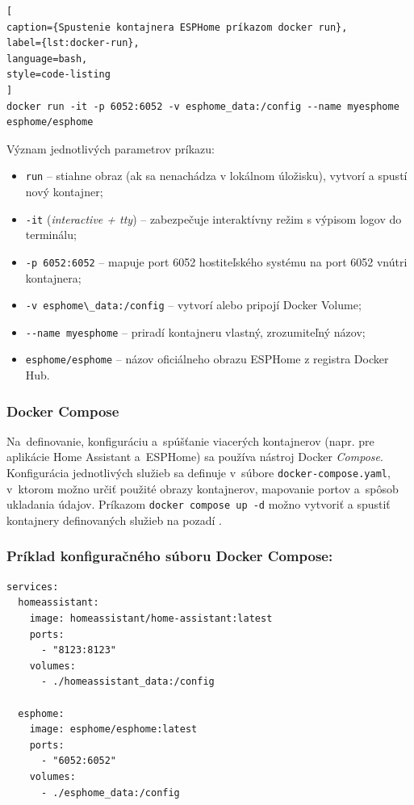 \begin{lstlisting}[
caption={Spustenie kontajnera ESPHome príkazom docker run},
label={lst:docker-run},
language=bash,
style=code-listing
]
docker run -it -p 6052:6052 -v esphome_data:/config --name myesphome esphome/esphome
\end{lstlisting}

Význam jednotlivých parametrov príkazu:
\begin{itemize}
  \item \verb|run| -- stiahne obraz (ak sa nenachádza v lokálnom úložisku), vytvorí a spustí nový kontajner;
  \item \verb|-it| (\emph{interactive + tty}) -- zabezpečuje interaktívny režim s výpisom logov do terminálu;
  \item \verb|-p 6052:6052| -- mapuje port 6052 hostiteľského systému na port 6052 vnútri kontajnera;
  \item \verb|-v esphome\_data:/config| -- vytvorí alebo pripojí Docker Volume;
  \item \verb|--name myesphome| -- priradí kontajneru vlastný, zrozumiteľný názov;
  \item \verb|esphome/esphome| -- názov oficiálneho obrazu ESPHome z registra Docker Hub.
\end{itemize}

\subsubsection{Docker Compose}
Na~definovanie, konfiguráciu a~spúšťanie viacerých kontajnerov (napr. pre aplikácie 
Home Assistant a~ESPHome) sa používa nástroj Docker \emph{Compose}. Konfigurácia jednotlivých 
služieb sa definuje v~súbore \verb|docker-compose.yaml|, v~ktorom možno určiť 
použité obrazy kontajnerov, mapovanie portov a~spôsob ukladania údajov. Príkazom 
\verb|docker compose up -d| možno vytvoriť a spustiť kontajnery definovaných 
služieb na pozadí \cite{docker_compose}. 

\subsubsection*{Príklad konfiguračného súboru Docker Compose:}

\begingroup
{}
\begin{lstlisting}
services:
  homeassistant:
    image: homeassistant/home-assistant:latest
    ports:
      - "8123:8123"
    volumes:
      - ./homeassistant_data:/config

  esphome:
    image: esphome/esphome:latest
    ports:
      - "6052:6052"
    volumes:
      - ./esphome_data:/config
\end{lstlisting}
\endgroup
